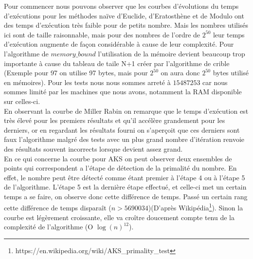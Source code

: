 	Pour commencer nous pouvons observer que les courbes d'évolutions du temps d'exécutions pour les méthodes naïve d'Euclide, d'Eratosthène et de Modulo ont des temps d'exécution très faible pour de petits nombre. Mais les nombres utilisés ici sont de taille raisonnable, mais pour des nombres de l'ordre de $2^{50}$ leur temps d'exécution augmente de façon considérable à cause de leur complexité. Pour l'algorithme de $memory\_bound$ l'utilisation de la mémoire devient beaucoup trop importante à cause du tableau de taile N+1 créer par l'algorithme de crible (Exemple pour 97 on utilise 97 bytes, mais pour $2^{50}$ on aura donc $2^{50}$ bytes utilisé en mémoires). Pour les tests nous nous sommes arreté à $15487253$ car nous sommes limité par les machines que nous avons, notamment la RAM disponible sur celles-ci.\\	
	
	En observant la courbe de Miller Rabin on remarque que le temps d'exécution est très élevé pour les premiers résultats et qu'il accélère grandement pour les derniers, or en regardant les résultats fourni on s'aperçoit que ces derniers sont faux l'algorithme malgré des tests avec un plus grand nombre d'itération renvoie des résultats souvent incorrects lorsque devient assez grand.\\		
		
		En ce qui concerne la courbe pour AKS on peut observer deux ensembles de points qui correspondent a l'étape de détection de la primalité du nombre. En effet, le nombre peut être  détecté comme étant premier à l'étape 4 ou à l'étape 5 de l'algorithme. L'étape 5 est la dernière étape effectué, et celle-ci met un certain temps a se faire, on observe donc cette différence de temps. Passé un certain rang cette différence de temps disparaît ($n > 5690034$)(D'après Wikipédia\footnote{https://en.wikipedia.org/wiki/AKS\_primality\_test}).
Sinon la courbe est légèrement croissante, elle va croître doucement compte tenu de la complexité de l’algorithme (O $\log(n)^{12}$).\\


